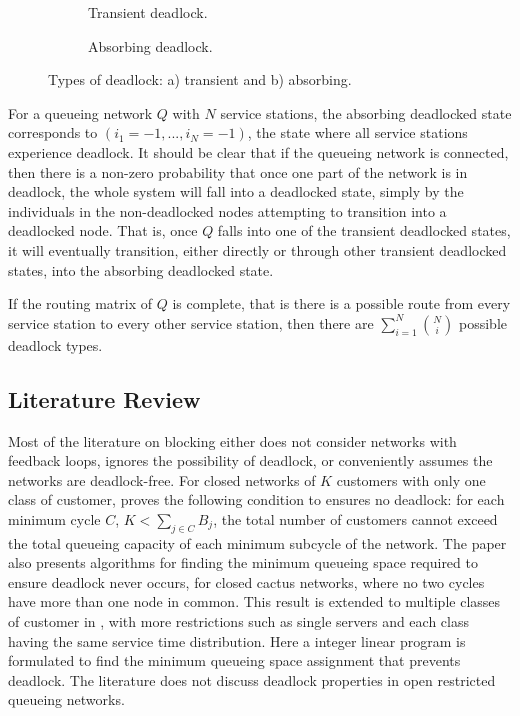 \documentclass{article}
\begin{document}
\begin{figure}[H]
\begin{subfigure}[b]{0.5\textwidth}
  
  \caption{Transient deadlock.}
  \label{fig:trans}
\end{subfigure}
\begin{subfigure}[b]{0.5\textwidth}
  
  \caption{Absorbing deadlock.}
  \label{fig:absorb}
\end{subfigure}
\caption{Types of deadlock: a) transient and b) absorbing.}
\label{fig:transabsorb}
\end{figure}

For a queueing network $Q$ with $N$ service stations, the absorbing deadlocked state corresponds to $(i_1=-1,...,i_N=-1)$, the state where all service stations experience deadlock.
It should be clear that if the queueing network is connected, then there is a non-zero probability that once one part of the network is in deadlock, the whole system will fall into a deadlocked state, simply by the individuals in the non-deadlocked nodes attempting to transition into a deadlocked node.
That is, once $Q$ falls into one of the transient deadlocked states, it will eventually transition, either directly or through other transient deadlocked states, into the absorbing deadlocked state.

If the routing matrix of $Q$ is complete, that is there is a possible route from every service station to every other service station, then there are $\sum_{i=1}^N \binom{N}{i}$ possible deadlock types.

\subsection{Literature Review}

Most of the literature on blocking either does not consider networks with feedback loops, ignores the possibility of deadlock, or conveniently assumes the networks are
deadlock-free.
For closed networks of $K$ customers with only one class of customer, \cite{kunduakyildiz89} proves the following condition to ensures no deadlock: for each minimum cycle $C$, $K < \sum_{j\in C} B_j$, the total number of customers cannot exceed the total queueing capacity of each minimum subcycle of the network.
The paper also presents algorithms for finding the minimum queueing space required to ensure deadlock never occurs, for closed cactus networks, where no two cycles have more than one node in common.
This result is extended to multiple classes of customer in \cite{liebeherrakyildiz95}, with more restrictions such as single servers and each class having the same service time distribution.
Here a integer linear program is formulated to find the minimum queueing space assignment that prevents deadlock.
The literature does not discuss deadlock properties in open restricted queueing networks.
\end{document}
